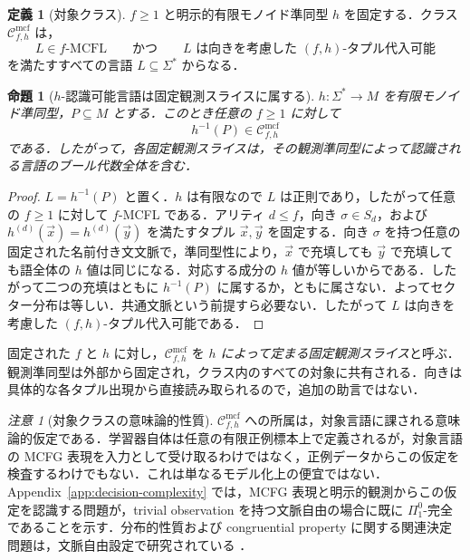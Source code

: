 \documentclass[11pt,a4paper]{ltjsarticle}
\numberwithin{equation}{section}
\theoremstyle{plain}
\newtheorem{proposition}[theorem]{命題}
\theoremstyle{definition}
\newtheorem{definition}[theorem]{定義}
\theoremstyle{remark}
\newtheorem{remark}[theorem]{注意}
\newcommand{\Cmcf}[2]{\mathcal{C}^{\mathrm{mcf}}_{#1,#2}}
\newcommand{\tuple}[1]{\vec{#1}}
\begin{document}
\begin{definition}[対象クラス]
\label{def:class-cmcf}
$f\ge1$ と明示的有限モノイド準同型 $h$ を固定する．クラス $\Cmcf{f}{h}$ は，
\[
  L\in f\text{-}\mathrm{MCFL}
  \qquad\text{かつ}\qquad
  L\text{ は向きを考慮した }(f,h)\text{-タプル代入可能}
\]
を満たすすべての言語 $L\subseteq\Sigma^*$ からなる．
\end{definition}

\begin{proposition}[$h$-認識可能言語は固定観測スライスに属する]
\label{prop:h-recognizable-in-slice}
$h:\Sigma^*\to M$ を有限モノイド準同型，$P\subseteq M$ とする．このとき任意の $f\ge1$ に対して
\[
  h^{-1}(P)\in\Cmcf{f}{h}
\]
である．したがって，各固定観測スライスは，その観測準同型によって認識される言語のブール代数全体を含む．
\end{proposition}

\begin{proof}
$L=h^{-1}(P)$ と置く．$h$ は有限なので $L$ は正則であり，したがって任意の $f\ge1$ に対して $f$-MCFL である．アリティ $d\le f$，向き $\sigma\in S_d$，および
$h^{(d)}(\tuple x)=h^{(d)}(\tuple y)$ を満たすタプル $\tuple x,\tuple y$ を固定する．向き $\sigma$ を持つ任意の固定された名前付き文文脈で，準同型性により，$\tuple x$ で充填しても $\tuple y$ で充填しても語全体の $h$ 値は同じになる．対応する成分の $h$ 値が等しいからである．したがって二つの充填はともに $h^{-1}(P)$ に属するか，ともに属さない．よってセクター分布は等しい．共通文脈という前提すら必要ない．したがって $L$ は向きを考慮した $(f,h)$-タプル代入可能である．
\end{proof}

固定された $f$ と $h$ に対し，$\Cmcf{f}{h}$ を \emph{$h$ によって定まる固定観測スライス}と呼ぶ．観測準同型は外部から固定され，クラス内のすべての対象に共有される．向きは具体的な各タプル出現から直接読み取られるので，追加の助言ではない．

\begin{remark}[対象クラスの意味論的性質]
\label{rem:semantic-class}
$\Cmcf{f}{h}$ への所属は，対象言語に課される意味論的仮定である．学習器自体は任意の有限正例標本上で定義されるが，対象言語の MCFG 表現を入力として受け取るわけではなく，正例データからこの仮定を検査するわけでもない．これは単なるモデル化上の便宜ではない．Appendix~\ref{app:decision-complexity} では，MCFG 表現と明示的観測からこの仮定を認識する問題が，trivial observation を持つ文脈自由の場合に既に $\Pi^0_1$-完全であることを示す．分布的性質および congruential property に関する関連決定問題は，文脈自由設定で研究されている
\cite{ClarkEyraud2007,Clark2017,KanazawaKappe2019}．
\end{remark}
\end{document}
